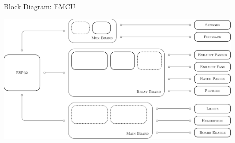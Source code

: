 \documentclass{beamer}
\begin{document}
\begin{frame} {Block Diagram: EMCU}

    \begin{center}

        \includegraphics[width = 0.9\textwidth]{emcu_block_diagram.pdf}

    \end{center}


\end{frame}
\end{document}
